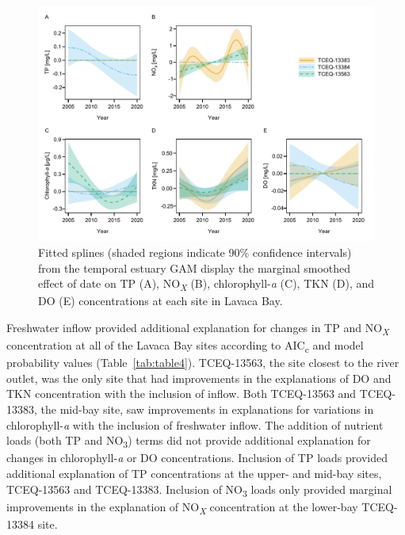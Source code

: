 \documentclass[fleqn,10pt,lineno]{wlpeerj} %
\begin{document}
\begin{figure}

{\centering \includegraphics[width=1\linewidth,]{Schramm-2023-08-PeerJ_files/figure-latex/fig5} 

}

\caption{Fitted splines (shaded regions indicate 90\% confidence intervals) from the temporal estuary GAM display the marginal smoothed effect of date on TP (A), NO\textit{\textsubscript{X}} (B), chlorophyll-\textit{a} (C), TKN (D), and DO (E) concentrations at each site in Lavaca Bay.}\label{fig:fig5}
\end{figure}

Freshwater inflow provided additional explanation for changes in TP and
NO\textsubscript{\emph{X}} concentration at all of the Lavaca Bay sites
according to AIC\textsubscript{c} and model probability values
(Table~\ref{tab:table4}). TCEQ-13563, the site closest to the river
outlet, was the only site that had improvements in the explanations of
DO and TKN concentration with the inclusion of inflow. Both TCEQ-13563
and TCEQ-13383, the mid-bay site, saw improvements in explanations for
variations in chlorophyll-\emph{a} with the inclusion of freshwater
inflow. The addition of nutrient loads (both TP and NO\textsubscript{3})
terms did not provide additional explanation for changes in
chlorophyll-\emph{a} or DO concentrations. Inclusion of TP loads
provided additional explanation of TP concentrations at the upper- and
mid-bay sites, TCEQ-13563 and TCEQ-13383. Inclusion of
NO\textsubscript{3} loads only provided marginal improvements in the
explanation of NO\textsubscript{\emph{X}} concentration at the lower-bay
TCEQ-13384 site.
\end{document}
